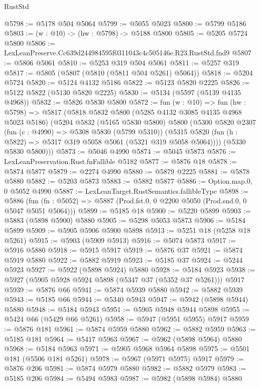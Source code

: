 \begin{lexlean}{RustStd}
\begin{coremodule}
@5798 := @5178 @504 @5064
@5799 := @5055 @5023
@5800 := @5799 @5186
@5803 := (w : @10) -> (hw : @5798) -> @5188 @5800
@5805 := @5205 @5724 @5800
@5806 := LexLeanPreserve.Cc639d244984595f0311043c4c505146e.R23.RustStd.fnd9
@5807 := @5806 @5061
@5810 := @5253 @319 @504 @5061
@5811 := @5257 @319
@5817 := @5805 (@5807 (@5810 (@5811 @504 @5261) @5064))
@5818 := @5204 @5724
@5820 := @5124 @4132 @5186
@5822 := @5123 @5820 @2225
@5826 := @5122 @5822 (@5130 @5820 @2225)
@5830 := @5134 (@5597 (@5139 @4135 @4968))
@5832 := @5826 @5830 @5800
@5872 := fun (w : @10) =>
  fun (hw : @5798) =>
  @5817
    (@5818
      @5832
      @5800
      (@5285 @4132 @3085 @4135 @4968 @5023 @5186)
      (@5204
        @5832
        (@5165 @5830 @5800)
        @5800
        (@5300
          @5820
          @2307
          (fun (c : @4990) => @5308 @5830 (@5799 @5310))
          (@5315 @5820 (fun (h : @5822) => @5317 @319 @5058 @5061 (@5321 @319 @5058 @5064))))
        (@5330 @5830 @5800)))
@5873 := @5046 @4990
@5874 := @5045 @5873
@5876 := LexLeanPreservation.Rust.fnFallible @5182
@5877 := @5876 @18
@5878 := @5874 @5877
@5879 := @2274 @4990
@5880 := @5879 @2225
@5881 := @5878 @5880
@5882 := @5203 @5873
@5883 := @5882 @5877
@5886 := Option.map.{0, 0} @5052 @4990
@5887 := LexLeanTarget.RustSemantics.fallibleType
@5898 := @5886
    (fun (fn : @5052) => @5887 (Prod.fst.{0, 0} @2200 @5050 (Prod.snd.{0, 0} @5047 @5051 @5064)))
@5899 := @5185 @18
@5900 := @5220 @5899
@5903 := @5883 (@5898 @5900) @5880
@5905 := @5298 @5053 @5873
@5906 := @5184 @5899
@5909 := @5905 @5906 @5900 @5898
@5913 := @5251 @18 (@5258 @18 @5261)
@5915 := @5903 (@5909 @5913)
@5916 := @5074 @5873
@5917 := @5916 @5880
@5918 := @5915 @5917
@5919 := @5876 @37
@5921 := @5874 @5919 @5880
@5922 := @5882 @5919
@5923 := @5185 @37
@5924 := @5244 @5923
@5927 := @5922 (@5898 @5924) @5880
@5928 := @5184 @5923
@5938 := @5927 (@5905 @5928 @5924 @5898 (@5347 @37 (@5352 @37 @5261))) @5917
@5939 := @5876 @66
@5941 := @5874 @5939 @5880
@5942 := @5882 @5939
@5943 := @5185 @66
@5944 := @5340 @5943
@5947 := @5942 (@5898 @5944) @5880
@5948 := @5184 @5943
@5951 := @5905 @5948 @5944 @5898
@5955 := @5424 @66 (@5429 @66 @5261)
@5958 := @5947 (@5951 @5955) @5917
@5959 := @5876 @181
@5961 := @5874 @5959 @5880
@5962 := @5882 @5959
@5963 := @5185 @181
@5964 := @5417 @5963
@5967 := @5962 (@5898 @5964) @5880
@5968 := @5184 @5963
@5971 := @5905 @5968 @5964 @5898
@5975 := @5501 @181 (@5506 @181 @5261)
@5978 := @5967 (@5971 @5975) @5917
@5979 := @5876 @206
@5981 := @5874 @5979 @5880
@5982 := @5882 @5979
@5983 := @5185 @206
@5984 := @5494 @5983
@5987 := @5982 (@5898 @5984) @5880

\end{coremodule}
\end{lexlean}
